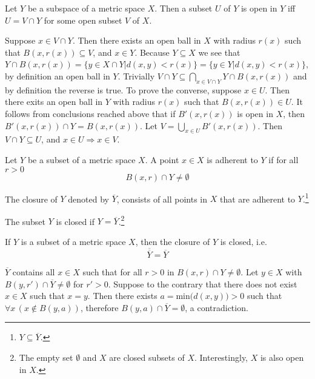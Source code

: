 \documentclass[nobib,notoc]{tufte-handout}
\begin{document}
\begin{thm}
	Let \(Y\) be a subspace of a metric space \(X\). Then a subset \(U\) of \(Y\) is open in \(Y\) iff \(U=V\cap Y\) for some open subset \(V\) of \(X\).
	\begin{IEEEproof}
		Suppose \(x\in V\cap Y\). Then there exists an open ball in \(X\) with radius \(r(x)\) such that \(B(x,r(x))\subseteq V\), and \(x\in Y\). Because \(Y\subseteq X\) we see that \(Y\cap B(x,r(x))=\{y\in X\cap Y|d(x,y)<r(x)\}=\{y\in Y|d(x,y)<r(x)\}\), by definition an open ball in \(Y\). Trivially \(V\cap Y\subseteq\bigcap_{x\in V\cap Y}Y\cap B(x,r(x))\) and by definition the reverse is true.\smallbreak
		To prove the converse, suppose \(x\in U\). Then there exits an open ball in \(Y\) with radius \(r(x)\) such that \(B(x, r(x))\in U\). It follows from conclusions reached above that if \(B'(x, r(x))\) is open in \(X\), then \(B'(x,r(x))\cap Y=B(x,r(x))\). Let \(V=\bigcup_{x\in U}B'(x,r(x))\). Then \(V\cap Y\subseteq U\), and \(x\in U\Rightarrow x\in V\).
\end{IEEEproof}
\end{thm}
\begin{defi}
	Let \(Y\) be a subset of a metric space \(X\). A point \(x\in X\) is adherent to \(Y\) if for all \(r>0\)
	\begin{equation*}
		B(x,r)\cap Y\neq\emptyset
	\end{equation*}
\end{defi}
\begin{defi}[Closure]
	The closure of \(Y\) denoted by \(\overline{Y}\), consists of all points in \(X\) that are adherent to \(Y\).\footnote{\(Y\subseteq\overline{Y}\).}
\end{defi}
\begin{defi}
	The subset \(Y\) is closed if \(Y=\overline{Y}\).\footnote{The empty set \(\emptyset\) and \(X\) are closed subsets of \(X\). Interestingly, \(X\) is also open in \(X\).}
\end{defi}
\begin{thm}
If \(Y\) is a subset of a metric space \(X\), then the closure of \(Y\) is closed, i.e.
	\begin{equation*}
		\overline{\overline{Y}}=\overline{Y}
	\end{equation*}
\begin{IEEEproof}
	\(\overline{Y}\) contains all \(x\in X\) such that for all \(r>0\) in \(B(x,r)\cap Y\neq\emptyset\). Let \(y\in X\) with \(B(y,r')\cap\overline{Y}\neq\emptyset\) for \(r'>0\). Suppose to the contrary that there does not exist \(x\in X\) such that \(x=y\). Then there exists \(a=\text{min}\big(d(x,y)\big)>0\) such that \(\forall x\,(x\notin B(y,a))\), therefore \(B(y,a)\cap\overline{Y}=\emptyset\), a contradiction.
\end{IEEEproof}
\end{thm}
\end{document}
